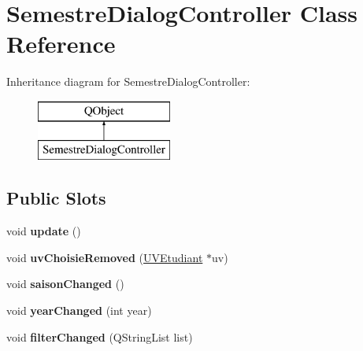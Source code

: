 \hypertarget{classSemestreDialogController}{\section{Semestre\+Dialog\+Controller Class Reference}
\label{classSemestreDialogController}
}
Inheritance diagram for Semestre\+Dialog\+Controller\+:\begin{figure}[H]
\begin{center}
\leavevmode
\includegraphics[height=2.000000cm]{classSemestreDialogController}
\end{center}
\end{figure}
\subsection*{Public Slots}
\begin{DoxyCompactItemize}
\item 
\hypertarget{classSemestreDialogController_a925085e9a56ae23743c0847311edc0b9}{void {\bfseries update} ()}\label{classSemestreDialogController_a925085e9a56ae23743c0847311edc0b9}

\item 
\hypertarget{classSemestreDialogController_abf99701af29111884c4c20176b2c2a32}{void {\bfseries uv\+Choisie\+Removed} (\hyperlink{classUVEtudiant}{U\+V\+Etudiant} $\ast$uv)}\label{classSemestreDialogController_abf99701af29111884c4c20176b2c2a32}

\item 
\hypertarget{classSemestreDialogController_ab3492ad04f1f7593e724b154a5d4e52b}{void {\bfseries saison\+Changed} ()}\label{classSemestreDialogController_ab3492ad04f1f7593e724b154a5d4e52b}

\item 
\hypertarget{classSemestreDialogController_a04840096badb41896bb5e902bc3576c4}{void {\bfseries year\+Changed} (int year)}\label{classSemestreDialogController_a04840096badb41896bb5e902bc3576c4}

\item 
\hypertarget{classSemestreDialogController_aa59e7840988eea5818109c98f8eafac4}{void {\bfseries filter\+Changed} (Q\+String\+List list)}\label{classSemestreDialogController_aa59e7840988eea5818109c98f8eafac4}

\end{DoxyCompactItemize}
